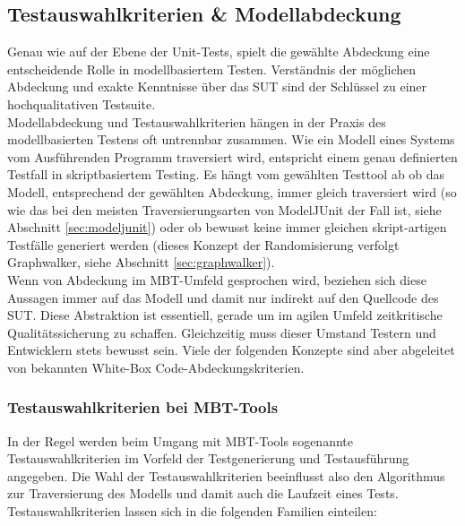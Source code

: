 \subsection{Testauswahlkriterien \& Modellabdeckung}
\label{sec:coverage}

Genau wie auf der Ebene der Unit-Tests, spielt die gewählte Abdeckung eine entscheidende Rolle in modellbasiertem Testen. Verständnis der möglichen Abdeckung und exakte Kenntnisse über das SUT sind der Schlüssel zu einer hochqualitativen Testsuite.\\
Modellabdeckung und Testauswahlkriterien hängen in der Praxis des modellbasierten Testens oft untrennbar zusammen. Wie ein Modell eines Systems vom Ausführenden Programm traversiert wird, entspricht einem genau definierten Testfall in skriptbasiertem Testing. Es hängt vom gewählten Testtool ab ob das Modell, entsprechend der gewählten Abdeckung, immer gleich traversiert wird (so wie das bei den meisten Traversierungsarten von ModelJUnit der Fall ist, siehe Abschnitt \ref{sec:modeljunit}) oder ob bewusst keine immer gleichen skript-artigen Testfälle generiert werden (dieses Konzept der Randomisierung verfolgt Graphwalker, siehe Abschnitt \ref{sec:graphwalker}).\\
Wenn von Abdeckung im MBT-Umfeld gesprochen wird, beziehen sich diese Aussagen immer auf das Modell und damit nur indirekt auf den Quellcode des SUT. Diese Abstraktion ist essentiell, gerade um im agilen Umfeld zeitkritische Qualitätssicherung zu schaffen.\cite{utting_practical_2007} Gleichzeitig muss dieser Umstand Testern und Entwicklern stets bewusst sein. Viele der folgenden Konzepte sind aber abgeleitet von bekannten White-Box Code-Abdeckungskriterien.

\subsubsection{Testauswahlkriterien bei MBT-Tools}
In der Regel werden beim Umgang mit MBT-Tools sogenannte Testauswahlkriterien im Vorfeld der Testgenerierung und Testausführung angegeben. Die Wahl der Testauswahlkriterien beeinflusst also den Algorithmus zur Traversierung des Modells und damit auch die Laufzeit eines Tests.\\
Testauswahlkriterien lassen sich in die folgenden Familien einteilen:

